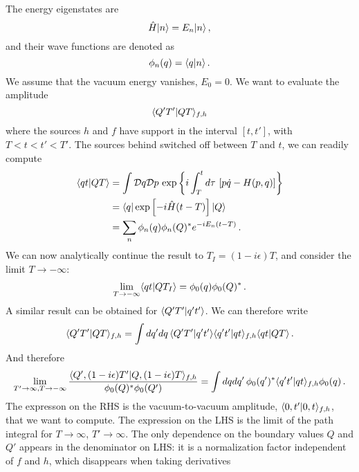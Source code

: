 The energy eigenstates are
\begin{equation}
  \label{eq:EnEigen}
  \hat{H} | n \rangle = E_n | n \rangle\, ,
\end{equation}
and their wave functions are denoted as
\begin{equation}
  \label{eq:EnEigenFun}
  \phi_n(q) = \langle q | n \rangle\, .
\end{equation}
We assume that the vacuum energy vanishes, $E_0=0$. We want to
evaluate the amplitude
\begin{equation}
  \label{eq:LargeQAmpl}
  \langle Q'T' | QT \rangle_{f,h}
\end{equation}
where the sources $h$ and $f$ have support in the interval $[t,t']$,
with $T < t < t' < T'$. The sources behind switched off between $T$
and $t$, we can readily compute
\begin{align}
  \langle qt | QT \rangle &= \int \mathcal{D}q \mathcal{D}p \,
                    \exp\left\{
                    i \int_T^t d\tau\, \left[
                    p \dot{q} - H(p,q)
                    \right]
                    \right\} \\
  &= \langle q | \exp\left[-i \hat{H} (t-T)\right] | Q \rangle \\
  &= \sum_n \phi_n(q) \phi_n(Q)^* e^{-i E_n(t-T)}\, .
\end{align}
We can now analytically continue the result to $T_I=(1-i\epsilon)T$,
and consider the limit $T\to -\infty$:
\begin{align}
  \lim_{T\to -\infty} \langle qt | QT_I \rangle = \phi_0(q) \phi_0(Q)^*\, .
\end{align}
A similar result can be obtained for $\langle Q'T' | q't' \rangle$. We can
therefore write
\begin{align}
  \langle Q'T' | QT \rangle_{f,h} = \int dq' dq\, \langle Q'T' | q't' \rangle \langle q't' | qt \rangle_{f,h}
  \langle qt | QT \rangle\, .
\end{align}
And therefore
\begin{align}
 \lim_{T'\to\infty,T\to -\infty} 
\frac{\langle Q', (1-i\epsilon)T' | Q, (1-i\epsilon)T \rangle_{f,h}}{\phi_0(Q)^* \phi_0(Q')} = 
  \int dq dq'\, \phi_0(q')^* \langle q't' | qt \rangle_{f,h} \phi_0(q)\, .
\end{align}
The expresson on the RHS is the vacuum-to-vacuum amplitude,
$\langle 0,t' | 0,t \rangle_{f,h}$, that we want to compute. The expression on
the LHS is the limit of the path integral for $T\to\infty$,
$T'\to\infty$. The only dependence on the boundary values $Q$ and $Q'$
appears in the denominator on LHS: it is a normalization factor
independent of $f$ and $h$, which disappears when taking derivatives

